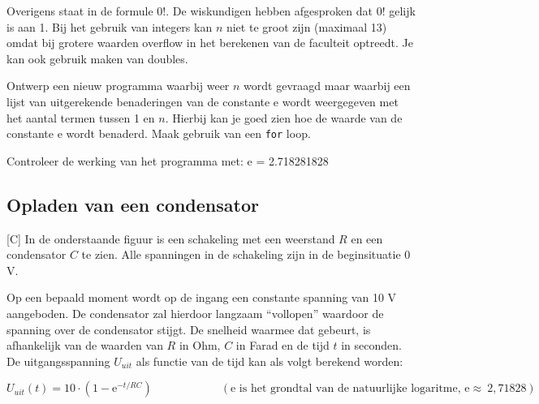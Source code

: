 \documentclass[a4paper,10pt,fleqn,twoside]{article}
\begin{document}
Overigens staat in de formule $0!$. De wiskundigen hebben afgesproken dat $0!$ gelijk is aan 1. Bij het gebruik van integers kan $n$ niet te groot zijn (maximaal 13) omdat bij grotere waarden overflow in het berekenen van de faculteit optreedt. Je kan ook gebruik maken van doubles.

Ontwerp een nieuw programma waarbij weer $n$ wordt gevraagd maar waarbij een lijst van uitgerekende benaderingen van de constante e wordt weergegeven met het aantal termen tussen 1 en $n$. Hierbij kan je goed zien hoe de waarde van de constante e wordt benaderd. Maak gebruik van een \lstinline|for| loop.

Controleer de werking van het programma met: e = 2.718281828

\subsection{Opladen van een condensator}[C]
In de onderstaande figuur is een  schakeling met een weerstand $R$ en een condensator $C$ te zien.
Alle spanningen in de schakeling zijn in de beginsituatie 0 V.

\begin{figure}[H]
\centering
{}
\end{figure}

Op een bepaald moment wordt op de ingang een constante spanning van 10 V aangeboden. De condensator zal hierdoor langzaam ``vollopen'' waardoor de spanning over de condensator stijgt. De snelheid waarmee dat gebeurt, is afhankelijk van de waarden van $R$ in Ohm, $C$ in Farad en de tijd $t$ in seconden.
De uitgangsspanning $U_{uit}$ als functie van de tijd kan als volgt berekend worden:

\begin{equation*}
U_{uit}(t) = 10\cdot(1-\mathrm{e}^{-t/RC}) \qquad\qquad\qquad (\text{e is het grondtal van de natuurlijke logaritme, e}\approx\ 2,71828)
\end{equation*}

\end{document}
